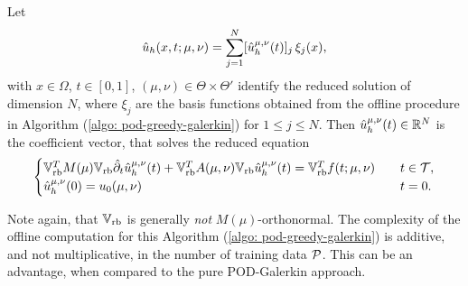 Let
\begin{equation} \label{eq: identity for pod greedy galerkin}
    \hat{u}_h(x, t; \mu, \nu) = \sum_{j=1}^N [\hat{u}_h^{\mu, \nu}(t)]_j \, \xi_j(x),
\end{equation}
with $x \in \Omega$, $t \in [0, 1]$, $(\mu, \nu) \in \Theta \times \Theta'$ 
identify the reduced solution of dimension $N$, where $\xi_j$ are the basis functions obtained from the offline procedure
in Algorithm (\ref{algo: pod-greedy-galerkin}) for $1 \leq j \leq N$. Then $\hat{u}_h^{\mu, \nu}(t) \in \mathbb{R}^N$ is the
coefficient vector, that solves the reduced equation
\begin{equation} \label{eq: reduced full discrete ppde greedy}
    \begin{cases}
        \mathbb{V}_\text{rb}^T M(\mu) \mathbb{V}_\text{rb} \hat{\partial}_t \hat{u}_h^{\mu, \nu}(t) + \mathbb{V}_\text{rb}^T A(\mu, \nu) \mathbb{V}_\text{rb} \hat{u}_h^{\mu, \nu}(t)
        = \mathbb{V}_\text{rb}^T f(t; \mu, \nu) \quad &t \in \mathcal{T}, \\
        \hat{u}_h^{\mu, \nu}(0) = u_0(\mu, \nu) \quad &t = 0.
    \end{cases}
\end{equation}

Note again, that $\mathbb{V}_\text{rb}$ is generally \emph{not} $M(\mu)$-orthonormal.
The complexity of the offline computation for this Algorithm (\ref{algo: pod-greedy-galerkin}) is additive, 
and not multiplicative, in the number of 
training data $\mathcal{P}$. This can be an advantage, when compared to the pure POD-Galerkin approach. 

